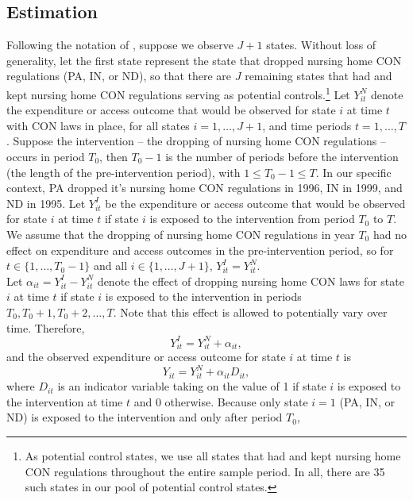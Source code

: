 \documentclass[../Main.tex]{subfiles}
\begin{document}
\subsection{Estimation} \label{estimation}
Following the notation of \citet{abadie2010synthetic}, suppose we observe $J+1$ states. Without loss of generality, let the first state represent the state that dropped nursing home CON regulations (PA, IN, or ND), so that there are $J$ remaining states that had and kept nursing home CON regulations serving as potential controls.\footnote{As potential control states, we use all states that had and kept nursing home CON regulations throughout the entire sample period. In all, there are 35 such states in our pool of potential control states.} Let $Y_{it}^N$ denote the expenditure or access outcome that would be observed for state $i$ at time $t$ with CON laws in place, for all states $i=1,\dots,J+1$, and time periods $t=1,\dots,T$. Suppose the intervention -- the dropping of nursing home CON regulations -- occurs in period $T_0$, then $T_0-1$ is the number of periods before the intervention (the length of the pre-intervention period), with $1\leq T_0-1 \leq T$. In our specific context, PA dropped it's nursing home CON regulations in 1996, IN in 1999, and ND in 1995. Let $Y_{it}^I$ be the expenditure or access outcome that would be observed for state $i$ at time $t$ if state $i$ is exposed to the intervention from period $T_0$ to $T$. We assume that the dropping of nursing home CON regulations in year $T_0$ had no effect on expenditure and access outcomes in the pre-intervention period, so for $t\in \{1,\dots,T_0-1\}$ and all $i\in \{1,\dots,J+1\}$, $Y_{it}^I=Y_{it}^N$.\\
\indent Let $\alpha_{it}=Y_{it}^I-Y_{it}^N$ denote the effect of dropping nursing home CON laws for state $i$ at time $t$ if state $i$ is exposed to the intervention in periods $T_0, T_0+1, T_0+2,\dots, T$. Note that this effect is allowed to potentially vary over time. Therefore,
\begin{equation}
    Y_{it}^I=Y_{it}^N+\alpha_{it} ,
\end{equation}
and the observed expenditure or access outcome for state $i$ at time $t$ is 
\begin{equation}
    Y_{it}=Y_{it}^N+\alpha_{it}D_{it} ,
\end{equation}
where $D_{it}$ is an indicator variable taking on the value of 1 if state $i$ is exposed to the intervention at time $t$ and $0$ otherwise. Because only state $i = 1$ (PA, IN, or ND) is exposed to the intervention and only after period $T_0$, 
\end{document}
